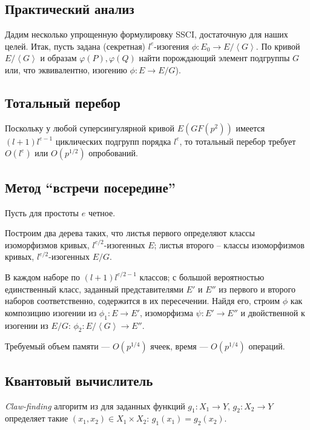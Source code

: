 \documentclass[a4paper,12pt]{article}
\newcommand{\tr}[1]{\left\langle #1\right\rangle}
\theoremstyle{definition}
\begin{document}
\subsection{Практический анализ}

Дадим несколько упрощенную формулировку SSCI, достаточную для наших целей. Итак, пусть задана (секретная) $l^e$-изогения $\phi:E_0\to E/\tr{G}$. По кривой $E/\tr{G}$ и образам $\varphi (P), \varphi(Q)$
найти порождающий элемент  подгруппы $ G$ или, что эквивалентно, изогению $\phi:E\to E/G$).
 
 \subsection*{Тотальный перебор}
  
Поскольку у любой суперсингулярной кривой $E (GF(p^2))$ имеется $(l+1)l^{e-1}$ циклических подгрупп порядка $l^e$, то тотальный перебор требует $O(l^e) $ или $O(p^{1/2})$ опробований.
 
 \subsection*{Метод ``встречи посередине''}

 Пусть для простоты $e$ четное.
 
Построим два дерева таких, что листья первого определяют классы изоморфизмов кривых, $l^{e/2}$-изогенных $E$;
листья второго -- классы изоморфизмов кривых, $l^{e/2}$-изогенных $E/G$.

В каждом наборе по $(l+1)l^{e/2-1}$ классов; с большой вероятностью единственный класс, заданный представителями $E'$ и $E''$ из первого и второго наборов соответственно, содержится в их пересечении. Найдя его, строим 
$\phi$ как композицию изогении из $\phi_1:E\to E'$, изоморфизма $\psi:E'\to E''$ и двойственной к изогении из $E/G$: ${\phi}_2:E/\tr{G}\to E''$.

Требуемый объем памяти --- $O(p^{1/4})$ ячеек, время --- $O(p^{1/4})$ операций.


 \subsection*{Квантовый вычислитель}

\emph{Claw-finding} алгоритм из \cite{quant} для заданных функций $g_1:X_1\to Y$, $g_2:X_2\to Y$ определяет такие $(x_1, x_2)\in X_1\times X_2$: $g_1(x_1)=g_2(x_2)$.
\end{document}
